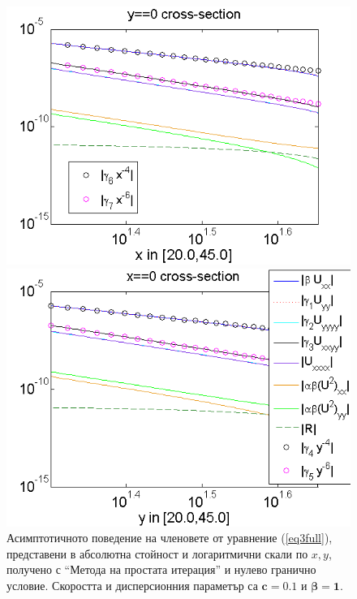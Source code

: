 \documentclass{article}
\newcommand{\rf}[1]{(\ref{#1})}
\begin{document}
\FloatBarrier
\begin{figure}[ht]
	\begin{minipage}[b]{0.95\linewidth}
		\raggedleft
		\includegraphics[width=\linewidth]{AssymptForEachTerm/bt1_c010_090/ChristovIC_AlongX_50_ZB2_bt1_c010_h020_O(h^6).png}
	\end{minipage}
	\begin{minipage}[b]{0.95\linewidth}
		 \raggedright
		\includegraphics[width=\linewidth]{AssymptForEachTerm/bt1_c010_090/ChristovIC_AlongY_50_ZB2_bt1_c010_h020_O(h^6).png}
	\end{minipage}
	\caption{Асимптотичното поведение на членовете от уравнение \rf{eq3full}, представени в абсолютна стойност и логаритмични скали по $x,y$, получено с ``Метода на простата итерация'' и нулево гранично условие. Скоростта и дисперсионния параметър са $\boldsymbol{c=0.1}$ и $\boldsymbol{\beta = 1}$. }
	\label{fig:assympt_beta1c01}
\end{figure}
\FloatBarrier
\end{document}
